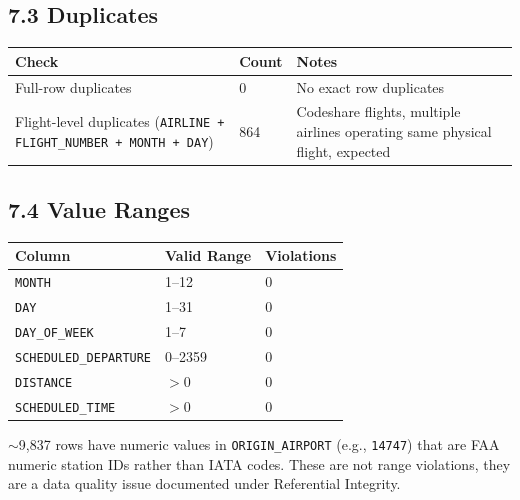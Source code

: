 \documentclass{article}
\newcommand{\code}[1]{\texttt{\small #1}}
\begin{document}
\subsection*{\textcolor{accentgold}{7.3 Duplicates}}

\begin{tcolorbox}[mainbox, title={Duplicate Check}]
\renewcommand{\arraystretch}{1.4}
\begin{tabularx}{\textwidth}{X C{1.8cm} L{6cm}}
    \toprule
    \textbf{Check} & \textbf{Count} & \textbf{Notes} \\
    \midrule
    Full-row duplicates & 0 & No exact row duplicates \\
    Flight-level duplicates (\code{AIRLINE + FLIGHT\_NUMBER + MONTH + DAY}) & 864 & Codeshare flights, multiple airlines operating same physical flight, expected \\
    \bottomrule
\end{tabularx}
\end{tcolorbox}

\subsection*{\textcolor{accentgold}{7.4 Value Ranges}}

\begin{tcolorbox}[mainbox, title={Numeric Column Range Checks}]
\renewcommand{\arraystretch}{1.4}
\begin{tabularx}{\textwidth}{L{5cm} L{3cm} C{2.5cm}}
    \toprule
    \textbf{Column} & \textbf{Valid Range} & \textbf{Violations} \\
    \midrule
    \code{MONTH}                & 1--12   & 0 \\
    \code{DAY}                  & 1--31   & 0 \\
    \code{DAY\_OF\_WEEK}        & 1--7    & 0 \\
    \code{SCHEDULED\_DEPARTURE} & 0--2359 & 0 \\
    \code{DISTANCE}             & $>0$    & 0 \\
    \code{SCHEDULED\_TIME}      & $>0$    & 0 \\
    \bottomrule
\end{tabularx}
\end{tcolorbox}

\begin{tcolorbox}[quotebox]
$\sim$9,837 rows have numeric values in \code{ORIGIN\_AIRPORT} (e.g., \code{14747}) that are FAA numeric station IDs rather than IATA codes. These are not range violations, they are a data quality issue documented under Referential Integrity.
\end{tcolorbox}
\end{document}
